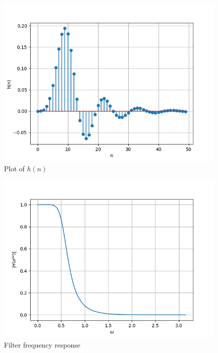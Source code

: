 \documentclass[journal,12pt,twocolumn]{IEEEtran}
\renewcommand\thesection{\arabic{section}}
\begin{document}
\begin{enumerate}[label=\thesection.\arabic*]
\begin{figure}[!htb]
	\includegraphics[width=\columnwidth]{figs/7_2_1.png}
	\caption{Plot of $h(n)$}
	\label{fig:butter-imp}
\end{figure}

\begin{figure}[!htb]
	\includegraphics[width=\columnwidth]{figs/7_2_2.png}
	\caption{Filter frequency response}
	\label{fig:butter-resp}
\end{figure}


\end{enumerate}
\end{document}
